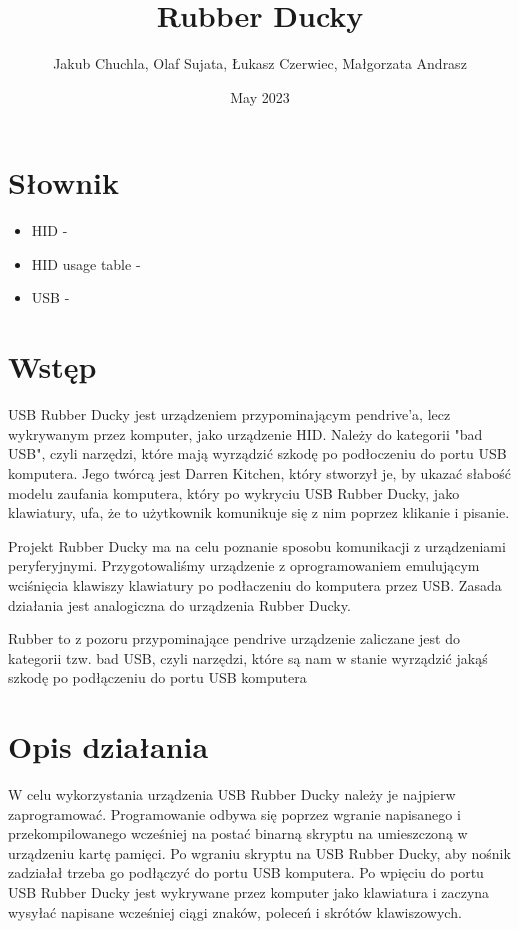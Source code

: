 \documentclass{article}
\title{Rubber Ducky}
\author{Jakub Chuchla, Olaf Sujata, Łukasz Czerwiec, Małgorzata Andrasz}
\date{May 2023}
\begin{document}
\maketitle

\tableofcontents

\section{Słownik}
\begin{itemize}
    \item HID - 
    \item HID usage table -
    \item USB -
\end{itemize}

\section{Wstęp}

USB Rubber Ducky jest urządzeniem przypominającym pendrive'a, lecz wykrywanym przez komputer, jako urządzenie HID. Należy do kategorii "bad USB", czyli narzędzi, które mają wyrządzić szkodę po podłoczeniu do portu USB komputera. Jego twórcą jest Darren Kitchen, który stworzył je, by ukazać słabość modelu zaufania komputera, który po wykryciu USB Rubber Ducky, jako klawiatury, ufa, że to użytkownik komunikuje się z nim poprzez klikanie i pisanie.

Projekt Rubber Ducky ma na celu poznanie sposobu komunikacji z urządzeniami peryferyjnymi. Przygotowaliśmy urządzenie z oprogramowaniem emulującym wciśnięcia klawiszy klawiatury po podłaczeniu do komputera przez USB. Zasada działania jest analogiczna do urządzenia Rubber Ducky. 

Rubber to z pozoru przypominające pendrive urządzenie zaliczane jest do kategorii tzw. bad USB, czyli narzędzi, które są nam w stanie wyrządzić jakąś szkodę po podłączeniu do portu USB komputera

\section{Opis działania}

W celu wykorzystania urządzenia USB Rubber Ducky należy je najpierw zaprogramować. Programowanie odbywa się poprzez wgranie napisanego i przekompilowanego wcześniej na postać binarną skryptu na umieszczoną w urządzeniu kartę pamięci. Po wgraniu skryptu na USB Rubber Ducky, aby nośnik zadziałał trzeba go podłączyć do portu USB komputera. Po wpięciu do portu USB Rubber Ducky jest wykrywane przez komputer jako klawiatura i zaczyna wysyłać napisane wcześniej ciągi znaków, poleceń i skrótów klawiszowych.
\end{document}
